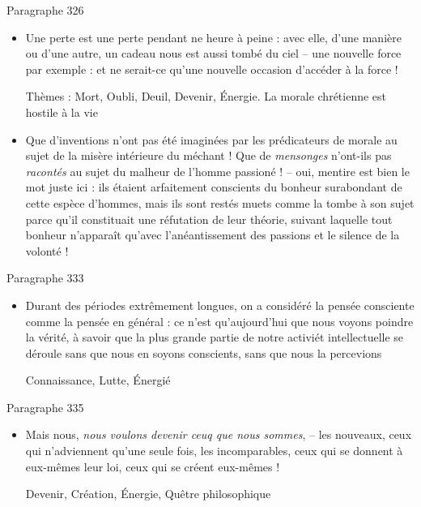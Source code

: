 \documentclass[french,a4paper,11pt,answers]{exam}
\newcommand{\cit}[2]{\og #1 \fg{} \begin{solution}{ #2 }\end{solution}} %
\begin{document}
	\begin{cadre}{Paragraphe 326}
		\begin{itemize}
			\item \cit{Une perte est une perte pendant ne heure à peine : avec elle, d'une manière ou d'une autre, un cadeau nous est aussi tombé du ciel -- une nouvelle force par exemple : et ne serait-ce qu'une nouvelle occasion d'accéder à la force !}
				{Thèmes : Mort, Oubli, Deuil, Devenir, Énergie. La morale chrétienne est hostile à la vie}
			\item \cit{Que d'inventions n'ont pas été imaginées par les prédicateurs de morale au sujet de la \og misère \fg{} intérieure du méchant ! Que de \emph{mensonges} n'ont-ils pas \emph{racontés} au sujet du malheur de l'homme passioné ! -- oui, mentire est bien le mot juste ici : ils étaient arfaitement conscients du bonheur surabondant de cette espèce d'hommes, mais ils sont restés muets comme la tombe à son sujet parce qu'il constituait une réfutation de leur théorie, suivant laquelle tout bonheur n'apparaît qu'avec l'anéantissement des passions et le silence de la volonté !}
				{}
		\end{itemize}
	\end{cadre}
	
	\begin{cadre}{Paragraphe 333}
		\begin{itemize}
			\item \cit{Durant des périodes extrêmement longues, on a considéré la pensée consciente comme la pensée en général : ce n'est qu'aujourd'hui que nous voyons poindre la vérité, à savoir que la plus grande partie de notre activiét intellectuelle se déroule sans que nous en soyons conscients, sans que nous la percevions}
				{Connaissance, Lutte, Énergié} %
		\end{itemize}
	\end{cadre}

	\begin{cadre}{Paragraphe 335}
		\begin{itemize}
			\item \cit{Mais nous, \emph{nous voulons devenir ceuq que nous sommes}, -- les nouveaux, ceux qui n'adviennent qu'une seule fois, les incomparables, ceux qui se donnent à eux-mêmes leur loi, ceux qui se créent eux-mêmes !}
				{Devenir, Création, Énergie, Quêtre philosophique}
		\end{itemize}
	\end{cadre}
\end{document}
